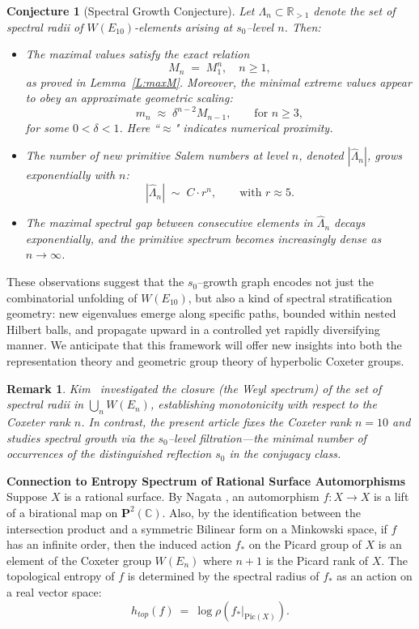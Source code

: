 \documentclass[11pt]{amsart}
\numberwithin{equation}{section}
\newtheorem*{conj}{Conjecture}
\newtheorem{rem}[thm]{Remark}
\begin{document}
\begin{conj}[Spectral Growth Conjecture]
Let $\Lambda_n\subset \mathbb{R}_{>1}$ denote the set of spectral radii of $W(E_{10})$-elements arising at $s_0$--level $n$. Then:
\begin{itemize}
\item[(i)] 
The maximal values satisfy the exact relation \[ M_n \;=\;M_1^n, \quad n\ge 1,\]
as proved in Lemma~\ref{L:maxM}. Moreover, the minimal extreme values appear to obey an approximate geometric scaling:
\[  m_n \;\approx\; \delta^{n-2} M_{n-1}, \qquad \text{for }n\ge3,\]
for some $0<\delta<1$. Here ``$\approx$" indicates numerical proximity.
\item[(ii)] The number of new primitive Salem numbers at level $n$, denoted $|\hat \Lambda_n|$, grows exponentially with $n$:
\[ |\hat \Lambda_n|\; \sim \; C \cdot r^n, \qquad \text{with } r \approx 5.\]
\item[(iii)] The maximal spectral gap between consecutive elements in $\hat \Lambda_n$ decays exponentially, and the primitive spectrum becomes increasingly dense as $n\to \infty$.
\end{itemize}
\end{conj}

These observations suggest that the $s_0$--growth graph encodes not just the combinatorial unfolding of $W(E_{10})$, but also a kind of spectral stratification geometry: new eigenvalues emerge along specific paths, bounded within nested Hilbert balls, and propagate upward in a controlled yet rapidly diversifying manner. We anticipate that this framework will offer new insights into both the representation theory and geometric group theory of hyperbolic Coxeter groups.

\begin{rem}
Kim~\cite{Kim-Salem} investigated the closure (the Weyl spectrum) of the set of spectral radii in $\bigcup_n W(E_n)$, establishing monotonicity with respect to the Coxeter rank $n$. In contrast, the present article fixes the Coxeter rank $n=10$ and studies spectral growth via the $s_0$--level filtration---the minimal number of occurrences of the distinguished reflection $s_0$ in the conjugacy class. 
\end{rem}


\medskip
\noindent\textbf{Connection to Entropy Spectrum of Rational Surface Automorphisms}
Suppose $X$ is a rational surface. By Nagata \cite{Nagata, Nagata2}, an automorphism $f: X\to X$ is a lift of a birational map on $\textbf{P}^2(\mathbb{C})$. Also, by the identification between the intersection product and a symmetric Bilinear form on a Minkowski space, if $f$ has an infinite order, then the induced action $f_*$ on the Picard group of $X$ is an element of the Coxeter group $W(E_n)$ where $n+1$ is the Picard rank of $X$. The topological entropy of $f$ is determined by the spectral radius of $f_*$ as an action on a real vector space:
\[ h_{top}(f) \ =\  \log \rho(f_*|_{{\text{Pic}(X)}}).\]
\end{document}
